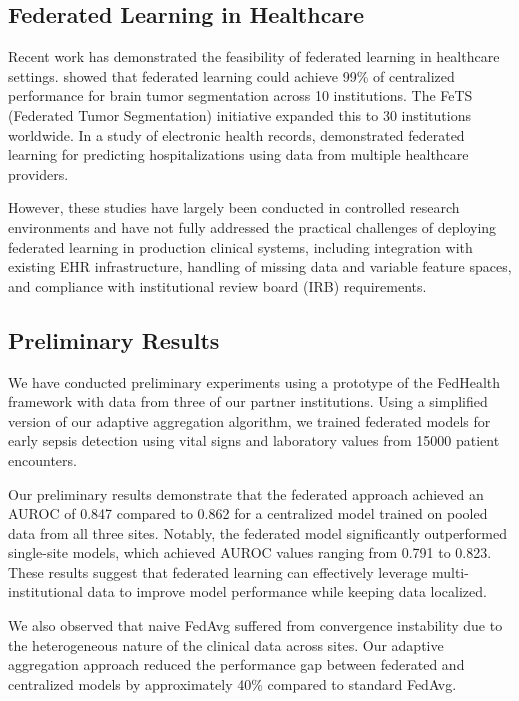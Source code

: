 \documentclass[12pt,letterpaper]{article}
\begin{document}
\subsection{Federated Learning in Healthcare}

Recent work has demonstrated the feasibility of federated learning in healthcare settings. \citet{Sheller2020} showed that federated learning could achieve 99\% of centralized performance for brain tumor segmentation across 10 institutions. The FeTS (Federated Tumor Segmentation) initiative \citep{Pati2021} expanded this to 30 institutions worldwide. In a study of electronic health records, \citet{Brisimi2018} demonstrated federated learning for predicting hospitalizations using data from multiple healthcare providers.

However, these studies have largely been conducted in controlled research environments and have not fully addressed the practical challenges of deploying federated learning in production clinical systems, including integration with existing EHR infrastructure, handling of missing data and variable feature spaces, and compliance with institutional review board (IRB) requirements.

\subsection{Preliminary Results}

We have conducted preliminary experiments using a prototype of the FedHealth framework with data from three of our partner institutions. Using a simplified version of our adaptive aggregation algorithm, we trained federated models for early sepsis detection using vital signs and laboratory values from 15000 patient encounters.

Our preliminary results demonstrate that the federated approach achieved an AUROC of 0.847 compared to 0.862 for a centralized model trained on pooled data from all three sites. Notably, the federated model significantly outperformed single-site models, which achieved AUROC values ranging from 0.791 to 0.823. These results suggest that federated learning can effectively leverage multi-institutional data to improve model performance while keeping data localized.

We also observed that naive FedAvg suffered from convergence instability due to the heterogeneous nature of the clinical data across sites. Our adaptive aggregation approach reduced the performance gap between federated and centralized models by approximately 40\% compared to standard FedAvg.
\end{document}
